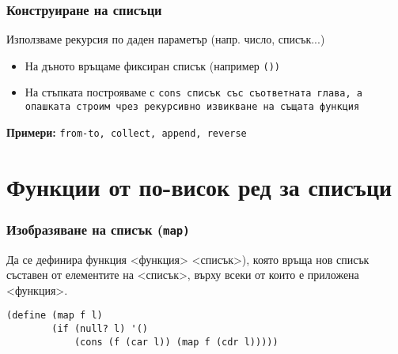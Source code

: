 \documentclass{beamer}
\begin{document}
\begin{frame}
  \frametitle{Конструиране на списъци}

  Използваме рекурсия по даден параметър (напр. число, списък...)
  \begin{itemize}
  \item На дъното връщаме фиксиран списък (например \tt{()})
  \item На стъпката построяваме с \tt{cons} списък със съответната глава, а опашката строим чрез рекурсивно извикване на същата функция
  \end{itemize}
  \pause
  \vspace{2em}
  \textbf{Примери:} \tt{from-to}, \tt{collect}, \tt{append}, \tt{reverse}
\end{frame}

\section{Функции от по-висок ред за списъци}

\begin{frame}[label=map,fragile]
  \frametitle{Изобразяване на списък (\tt{map})}

  Да се дефинира функция <функция> <списък>\tta), която връща нов списък съставен от елементите на <списък>, върху всеки от които е приложена <функция>.\\
  \pause
  \begin{center}
  \end{center}
  \pause
\begin{lstlisting}
(define (map f l)
        (if (null? l) '()
            (cons (f (car l)) (map f (cdr l)))))
\end{lstlisting}
\end{frame}
\end{document}
